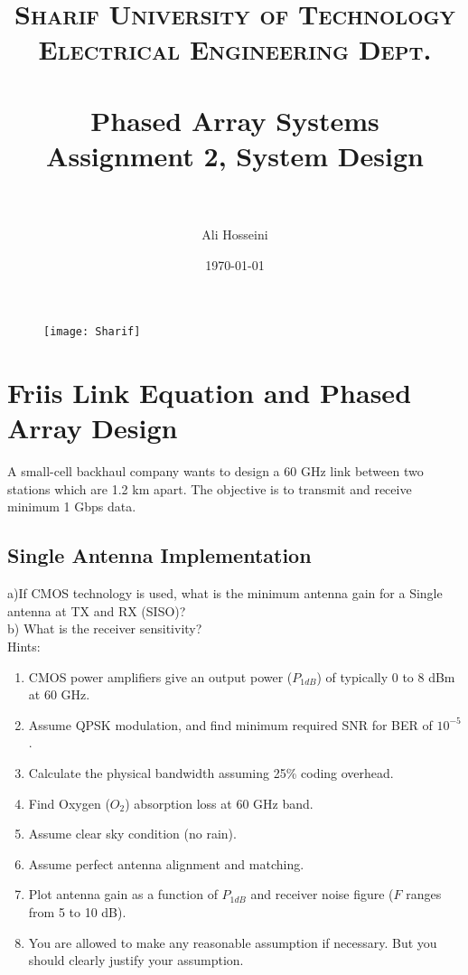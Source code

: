 \documentclass[paper=a4, fontsize=11pt]{scrartcl} %
\title{	
\normalfont \normalsize 
\textsc{Sharif University of Technology\\ Electrical Engineering Dept.} \\ [25pt] %
\horrule{0.5pt} \\[0.4cm] %
\huge Phased Array Systems\\ Assignment 2, System Design  \\ %
\horrule{2pt} \\[0.5cm] %
}
\author{Ali Hosseini} %
\date{\normalsize\today} %
\numberwithin{equation}{section} %
\numberwithin{figure}{section} %
\numberwithin{table}{section} %
\begin{document}
\maketitle %
\begin{figure}[!t]
\centering
\texttt{[image: Sharif]}
\end{figure}
\section{Friis Link Equation and Phased Array Design}

A small-cell backhaul company wants to design a 60 GHz link between two stations which are 1.2 km apart. The objective is to transmit and receive minimum 1 Gbps data. \\

\subsection{Single Antenna Implementation}\label{SISO}
a)If CMOS technology is used, what is the minimum antenna gain for a Single antenna at TX and RX (SISO)? \\
b) What is the receiver sensitivity?\\

Hints:\\
\begin{enumerate}
\item CMOS power amplifiers give an output power ($P_{1dB}$) of typically 0 to 8 dBm at 60 GHz.
\item Assume QPSK modulation, and find minimum required SNR for BER of $10^{-5}$.
\item Calculate the physical bandwidth assuming 25\% coding overhead.
\item Find Oxygen ($O_2$) absorption loss at 60 GHz band.
\item Assume clear sky condition (no rain).
\item Assume perfect antenna alignment and matching. 
\item  Plot antenna gain as a function of $P_{1dB}$ and receiver noise figure ($F$ ranges from 5 to 10 dB).
\item You are allowed to make any reasonable assumption if necessary. But you should clearly justify your assumption.
\end{enumerate}
\end{document}

